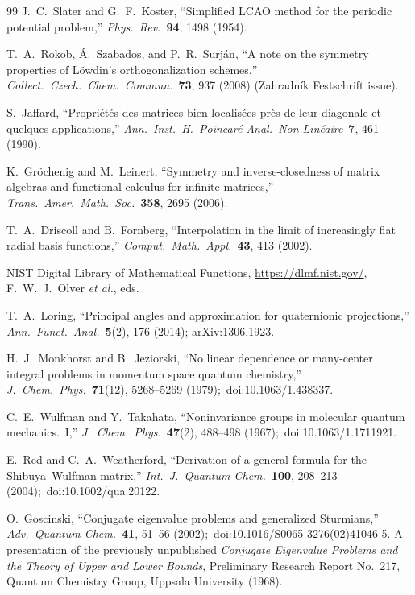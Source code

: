 \documentclass[aps,pra,twocolumn,superscriptaddress,longbibliography]{revtex4-2}
\begin{document}
\begin{thebibliography}{99}
J.~C.~Slater and G.~F.~Koster, ``Simplified LCAO method for the periodic
potential problem,'' \textit{Phys.\ Rev.}\ \textbf{94}, 1498 (1954).

T.~A.~Rokob, \'A.~Szabados, and P.~R.~Surj\'an, ``A note on the symmetry
properties of L\"owdin's orthogonalization schemes,''
\textit{Collect.\ Czech.\ Chem.\ Commun.}\ \textbf{73}, 937 (2008)
(Zahradn\'ik Festschrift issue).

S.~Jaffard, ``Propri\'et\'es des matrices bien localis\'ees pr\`es de leur
diagonale et quelques applications,'' \textit{Ann.\ Inst.\ H.\ Poincar\'e
Anal.\ Non Lin\'eaire}\ \textbf{7}, 461 (1990).

K.~Gr\"ochenig and M.~Leinert, ``Symmetry and inverse-closedness of matrix
algebras and functional calculus for infinite matrices,''
\textit{Trans.\ Amer.\ Math.\ Soc.}\ \textbf{358}, 2695 (2006).

T.~A.~Driscoll and B.~Fornberg, ``Interpolation in the limit of increasingly
flat radial basis functions,'' \textit{Comput.\ Math.\ Appl.}\ \textbf{43},
413 (2002).

NIST Digital Library of Mathematical Functions, \url{https://dlmf.nist.gov/},
F.~W.~J.~Olver \textit{et al.}, eds.

T.~A.~Loring, ``Principal angles and approximation for quaternionic
projections,'' \textit{Ann.\ Funct.\ Anal.}\ \textbf{5}(2), 176 (2014);
arXiv:1306.1923.

H.~J.~Monkhorst and B.~Jeziorski, ``No linear dependence or many-center integral
problems in momentum space quantum chemistry,'' \textit{J.\ Chem.\ Phys.}\
\textbf{71}(12), 5268--5269 (1979);\ doi:10.1063/1.438337.

C.~E.~Wulfman and Y.~Takahata, ``Noninvariance groups in molecular quantum
mechanics.\ I,'' \textit{J.\ Chem.\ Phys.}\ \textbf{47}(2), 488--498 (1967);\
doi:10.1063/1.1711921.

E.~Red and C.~A.~Weatherford, ``Derivation of a general formula for the
Shibuya--Wulfman matrix,'' \textit{Int.\ J.\ Quantum Chem.}\ \textbf{100},
208--213 (2004);\ doi:10.1002/qua.20122.

O.~Goscinski, ``Conjugate eigenvalue problems and generalized Sturmians,''
\textit{Adv.\ Quantum Chem.}\ \textbf{41}, 51--56 (2002);\
doi:10.1016/S0065-3276(02)41046-5.  A presentation of the previously
unpublished \textit{Conjugate Eigenvalue Problems and the Theory of Upper and
Lower Bounds}, Preliminary Research Report No.~217, Quantum Chemistry Group,
Uppsala University (1968).


\end{thebibliography}
\end{document}
